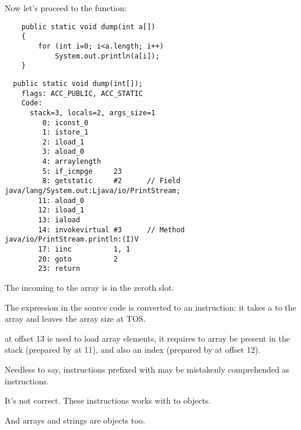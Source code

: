 Now let's proceed to the  function:

\begin{lstlisting}
	public static void dump(int a[])
	{
		for (int i=0; i<a.length; i++)
			System.out.println(a[i]);
	}
\end{lstlisting}

\begin{lstlisting}
  public static void dump(int[]);
    flags: ACC_PUBLIC, ACC_STATIC
    Code:
      stack=3, locals=2, args_size=1
         0: iconst_0      
         1: istore_1      
         2: iload_1       
         3: aload_0       
         4: arraylength   
         5: if_icmpge     23
         8: getstatic     #2      // Field java/lang/System.out:Ljava/io/PrintStream;
        11: aload_0       
        12: iload_1       
        13: iaload        
        14: invokevirtual #3      // Method java/io/PrintStream.println:(I)V
        17: iinc          1, 1
        20: goto          2
        23: return        
\end{lstlisting}

The incoming  to the array is in the zeroth slot.

The  expression in the source code is converted to an  instruction: 
it takes a  to the array and leaves the array size at \ac{TOS}.

 at offset 13 is used to load array elements, 
it requires to array  be present
in the stack (prepared by  at 11), 
and also an index (prepared by  at offset 12).

Needless to say, instructions prefixed with  may be mistakenly comprehended 
as  instructions.

It's not correct.
These instructions works with  to objects.

And arrays and strings are objects too.

